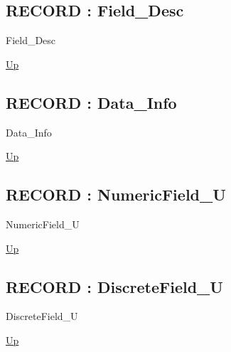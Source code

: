 \par
\par
\subsection*{RECORD : Field\_Desc}
\hypertarget{ecldoc:logisticregression.types.field_desc}{}
\begin{minipage}[t]{\textwidth}
\begin{flushleft}
 Field\_Desc 
\end{flushleft}
\end{minipage}
\hyperlink{ecldoc:LogisticRegression.Types}{Up}

\par
\par
\subsection*{RECORD : Data\_Info}
\hypertarget{ecldoc:logisticregression.types.data_info}{}
\begin{minipage}[t]{\textwidth}
\begin{flushleft}
 Data\_Info 
\end{flushleft}
\end{minipage}
\hyperlink{ecldoc:LogisticRegression.Types}{Up}

\par
\par
\subsection*{RECORD : NumericField\_U}
\hypertarget{ecldoc:logisticregression.types.numericfield_u}{}
\begin{minipage}[t]{\textwidth}
\begin{flushleft}
 NumericField\_U 
\end{flushleft}
\end{minipage}
\hyperlink{ecldoc:LogisticRegression.Types}{Up}

\par
\par
\subsection*{RECORD : DiscreteField\_U}
\hypertarget{ecldoc:logisticregression.types.discretefield_u}{}
\begin{minipage}[t]{\textwidth}
\begin{flushleft}
 DiscreteField\_U 
\end{flushleft}
\end{minipage}
\hyperlink{ecldoc:LogisticRegression.Types}{Up}

